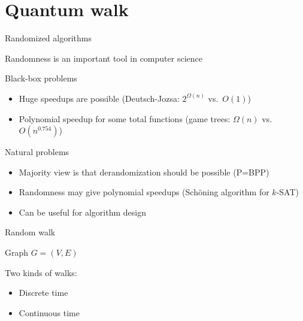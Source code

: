 
\part{Quantum walk}
\begin{frame}
  \partpage
\label{part:walk}
\end{frame}


\begin{frame}{Randomized algorithms}
  
Randomness is an important tool in computer science

\pause
\bigskip

Black-box problems \pause
\begin{itemize}[<+->]
  \item Huge speedups are possible (Deutsch-Jozsa: $2^{\Omega(n)}$ vs.\ $O(1)$)
  \item Polynomial speedup for some total functions (game trees: $\Omega(n)$ vs.\ $O(n^{0.754})$)
\end{itemize}

\pause
\bigskip

Natural problems \pause
\begin{itemize}[<+->]
  \item Majority view is that derandomization should be possible (P=BPP)
  \item Randomness may give polynomial speedups (Sch\"oning algorithm for $k$-SAT)
  \item Can be useful for algorithm design
\end{itemize}

\end{frame}


\begin{frame}{Random walk}

Graph $G=(V,E)$ \hspace{3ex}

\pause
\bigskip
\bigskip

Two kinds of walks:
\begin{itemize}
  \item Discrete time
  \item Continuous time
\end{itemize}

\end{frame}


